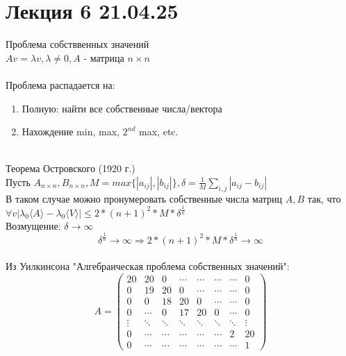 \section{Лекция 6 21.04.25}
Проблема собстввенных значений
\\
\(Av = \lambda v, \lambda \ne 0, A\) - матрица \({n \times n}\)
\\
\\
Проблема распадается на:
\begin{enumerate}
    \item Полную: найти все собственные числа/вектора 
    \item Нахождение min, max,  \(2^{nd}\) max, etc.
\end{enumerate}
\\
Теорема Островского (1920 г.)  \\
Пусть \(A_{n \times n}, B_{n \times n}, M = max\{ |a_{ij}|, |b_{ij}|\}, \delta = \frac{1}{M}\sum_{i,j}|a_{ij} - b_{ij}|\) \\
В таком случае можно пронумеровать собственные числа матриц \(A, B\) так, что \(\forall v |\lambda_0\langle A \rangle - \lambda_0\langle V \rangle| \leq 2 * (n+1)^2 *M * \delta^{\frac{1}{n}} \) \\
Возмущение: \(\delta \rightarrow \infty\) \\
\[\delta^{\frac{1}{n}} \rightarrow \infty \Rightarrow 2 * (n+1)^2 *M * \delta^{\frac{1}{n}} \rightarrow \infty \] \\
Из Уилкинсона "Алгебраическая проблема собственных значений": \\
    \[
    A = 
    \begin{pmatrix}
    20 & 20 & 0 &\cdots & \cdots &\cdots & \cdots &0  \\
    0 & 19 & 20 & 0 & \cdots &\cdots  & \cdots & 0\\
    0 & 0 & 18 & 20 & 0 &\cdots & \cdots & 0\\
    0 &\cdots& 0 & 17 & 20 & 0 & \cdots & 0\\
    \vdots & \ddots & \ddots & \ddots & \ddots & \ddots & \ddots & \vdots \\

    0 & \cdots & \cdots & \cdots & \cdots & \cdots & 2 & 20 \\
    0 & \cdots & \cdots & \cdots & \cdots & \cdots & \cdots & 1
    \end{pmatrix}
    \]

